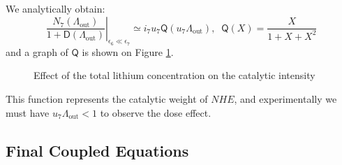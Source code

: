 \documentclass[aps,onecolumn,11pt]{revtex4}
\newcommand{\myout}[1]{{#1}_{\mathrm{out}}}
\newcommand{\LiAll}{\Lambda}
\newcommand{\LiAllOut}{\myout{\LiAll}}
\begin{document}
We analytically obtain:
\begin{equation}
\left.\dfrac{N_7(\LiAllOut)}{1+\mathsf{D}(\LiAllOut)}\right\vert_{\epsilon_6\ll\epsilon_7} \simeq i_7 u_7 \mathsf{Q}\left(u_7\LiAllOut\right),\;\;\mathsf{Q}(X) = \dfrac{X}{1+X+X^2}
\end{equation}
and a graph of $\mathsf{Q}$ is shown on Figure \ref{fig:Q}. 
\begin{figure}[!ht]
\begin{center}

\end{center}
\caption{\label{fig:Q} Effect of the total lithium concentration on the catalytic intensity}
\end{figure}
This function represents the catalytic weight of $NHE$, and experimentally we must have $u_7\LiAllOut<1$ to observe the dose effect.

\subsection{Final Coupled Equations}
\end{document}
